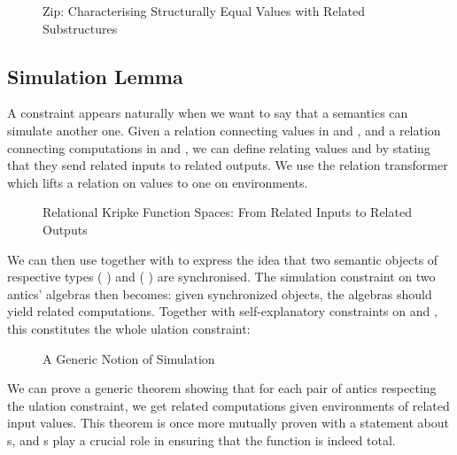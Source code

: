 \begin{figure}[h]
\caption{Zip: Characterising Structurally Equal Values with Related Substructures}
\end{figure}



\subsection{Simulation Lemma}

A  constraint appears naturally when we want to say that a
semantics can simulate another one. Given a relation connecting values
in  and , and a relation connecting computations in
 and , we can define  relating values
   and   
by stating that they send related inputs to related outputs. We use
the relation transformer  which lifts a relation on values
to one on environments.

\begin{figure}[h]
\caption{Relational Kripke Function Spaces: From Related Inputs to Related Outputs}
\end{figure}

We can then use  together with  to express the idea
that two semantic objects of respective types
   (  ) and
   (  ) are
synchronised. The simulation constraint on two antics' algebras
then becomes: given synchronized objects, the algebras should yield
related computations. Together with self-explanatory constraints on
 and , this constitutes the whole ulation
constraint:

\begin{figure}[h]
\caption{A Generic Notion of Simulation}
\end{figure}

We can prove a generic theorem showing that for each pair of antics
respecting the ulation constraint, we get related computations given
environments of related input values. This theorem is once more mutually
proven with a statement about s, and s play a crucial
role in ensuring that the function is indeed total.

